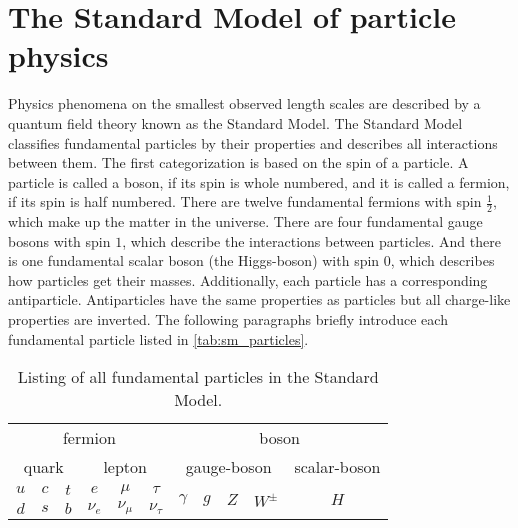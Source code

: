 \section{The Standard Model of particle physics}

Physics phenomena on the smallest observed length scales are described by a quantum field theory known as the Standard Model.
The Standard Model classifies fundamental particles by their properties and describes all interactions between them. 
The first categorization is based on the spin of a particle. 
A particle is called a boson, if its spin is whole numbered, and it is called a fermion, if its spin is half numbered.
There are twelve fundamental fermions with spin $\frac{1}{2}$, which make up the matter in the universe.
There are four fundamental gauge bosons with spin $1$, which describe the interactions between particles. 
And there is one fundamental scalar boson (the Higgs-boson) with spin $0$, which describes how particles get their masses.
Additionally, each particle has a corresponding antiparticle. 
Antiparticles have the same properties as particles but all charge-like properties are inverted.
The following paragraphs briefly introduce each fundamental particle listed in \autoref{tab:sm_particles}.

\begin{table}
    \centering
    \caption{Listing of all fundamental particles in the Standard Model.}
    \begin{tabular}{c c c | c c c | c c c c | c}
        \toprule
        \multicolumn{6}{c|}{fermion} & \multicolumn{5}{c}{boson} \\
        \multicolumn{3}{c}{quark} & \multicolumn{3}{c|}{lepton} & \multicolumn{4}{c}{gauge-boson} & \multicolumn{1}{c}{scalar-boson} \\
        \midrule
        $u$ & $c$ & $t$ & $e$ & $\mu$ & $\tau$ & \multirow{2}{*}{$\gamma$} & \multirow{2}{*}{$g$} & \multirow{2}{*}{$Z$} & \multirow{2}{*}{$W^\pm$} & \multirow{2}{*}{$H$} \\
        $d$ & $s$ & $b$ & $\nu_e$ & $\nu_\mu$ & $\nu_\tau$ &&&&& \\
        \bottomrule
    \end{tabular}
    \label{tab:sm_particles}
\end{table}

